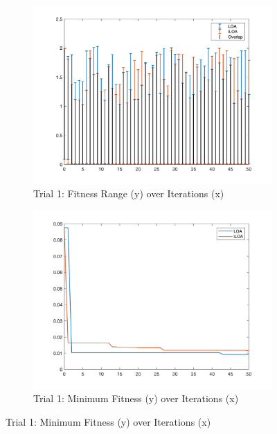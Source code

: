\begin{figure}
  \centering
  \begin{subfigure}[b]{0.4\textwidth}
    \includegraphics[width=\textwidth]{img/bars/f2/1}
    \caption{ \scriptsize Trial 1: Fitness Range (y) over Iterations (x)}
    \label{fig:f2-b-1}
  \end{subfigure}
  \begin{subfigure}[b]{0.4\textwidth}
    \includegraphics[width=\textwidth]{img/fits/f2/1}
    \caption{ \scriptsize Trial 1: Minimum Fitness (y) over Iterations (x)}
    \label{fig:f2-f-1}
  \end{subfigure}


\end{figure}
